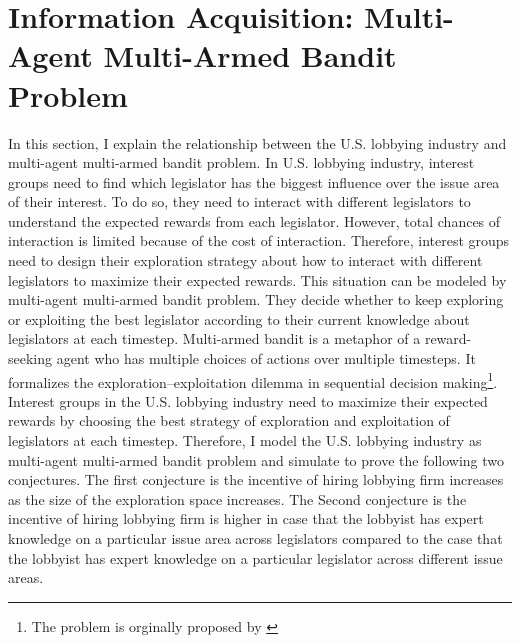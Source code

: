 \documentclass{article}
\begin{document}


\section{Information Acquisition: Multi-Agent Multi-Armed Bandit Problem}

In this section, I explain 
the relationship between 
the U.S. lobbying industry
and multi-agent multi-armed bandit problem.
In U.S. lobbying industry, interest groups 
need to find which legislator
has the biggest influence over the issue area 
of their interest.
To do so,
they need to interact with different legislators 
to understand the expected rewards from each legislator.
However, total chances of interaction is limited 
because of the cost of interaction.
Therefore, interest groups 
need to design their 
exploration strategy about 
how to interact with different legislators
to maximize their expected rewards.
This situation can be modeled by multi-agent multi-armed bandit problem.
They decide 
whether to 
keep exploring or 
exploiting the best legislator according to their current knowledge about legislators 
at each timestep.
Multi-armed bandit 
is a metaphor of a reward-seeking agent 
who has multiple choices of actions over multiple timesteps.
It formalizes the exploration–exploitation dilemma 
in sequential decision making\footnote{The problem is orginally 
proposed by \cite{Robbins1952SomeAO}
}.
Interest groups in the U.S. lobbying industry
need to maximize their expected rewards 
by choosing the best strategy of exploration and exploitation of legislators at each timestep.
Therefore, 
I model the U.S. lobbying industry as multi-agent multi-armed bandit problem
and simulate to prove the following two conjectures. 
The first conjecture is  
the incentive of hiring lobbying firm increases
as the size of the exploration space increases.
The Second conjecture is
the incentive of hiring lobbying firm is higher in 
case that the lobbyist has expert knowledge on a 
particular issue area across legislators
compared to the case that 
the lobbyist has expert knowledge 
on a particular legislator across different issue areas.
\end{document}
